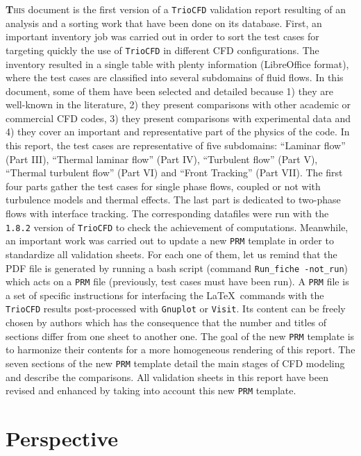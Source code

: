 \lettrine[lines=2,slope=0pt,nindent=4pt]{\textbf{T}}{his} document
is the first version of a \texttt{TrioCFD} validation report resulting
of an analysis and a sorting work that have been done on its database.
First, an important inventory job was carried out in order to sort
the test cases for targeting quickly the use of \texttt{TrioCFD}
in different CFD configurations. The inventory resulted in a single
table with plenty information (LibreOffice format), where the test
cases are classified into several subdomains of fluid flows. In this
document, some of them have been selected and detailed because 1)
they are well-known in the literature, 2) they present comparisons
with other academic or commercial CFD codes, 3) they present comparisons
with experimental data and 4) they cover an important and representative part of the
physics of the code. In this report, the test cases are representative
of five subdomains: ``Laminar flow'' (Part III), ``Thermal laminar
flow'' (Part IV), ``Turbulent flow'' (Part V), ``Thermal turbulent
flow'' (Part VI) and ``Front Tracking'' (Part VII). The first four
parts gather the test cases for single phase flows, coupled or not with
turbulence models and thermal effects. The last part is dedicated
to two-phase flows with interface tracking. The corresponding datafiles
were run with the \texttt{1.8.2} version of \texttt{TrioCFD}
to check the achievement of computations. Meanwhile, an important
work was carried out to update a new \texttt{PRM} template in order
to standardize all validation sheets. For each one of them, let us
remind that the PDF file is generated by running a bash script (command
\texttt{Run\_fiche -not\_run}) which acts on a \texttt{PRM} file (previously, test cases must have
been run). A \texttt{PRM} file is a set of specific instructions for interfacing
the \LaTeX ~commands with the \texttt{TrioCFD} results post-processed
with \texttt{Gnuplot} or \texttt{Visit}. Its content can be freely
chosen by authors which has the consequence that the number and titles
of sections differ from one sheet to another one. The goal of the
new \texttt{PRM} template is to harmonize their contents for a more
homogeneous rendering of this report. The seven sections of the new
\texttt{PRM} template detail the main stages of CFD modeling and describe
the comparisons. All validation sheets in this report have been revised
and enhanced by taking into account this new \texttt{PRM} template.

\section*{Perspective}

